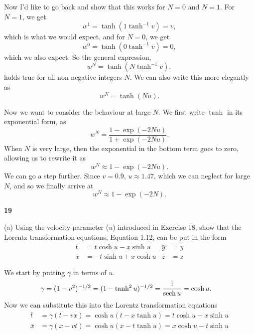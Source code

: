 \documentclass[gr-notes.tex]{subfiles}
\begin{document}
Now I'd like to go back and show that this works for $N=0$ and $N=1$. For $N=1$, we get
%
\begin{displaymath}
  w^1 = \tanh( 1 \tanh^{-1} v ) = v,
\end{displaymath}
%
which is what we would expect, and for $N=0$, we get
%
\begin{displaymath}
  w^0 = \tanh( 0 \tanh^{-1} v ) = 0,
\end{displaymath}
%
which we also expect. So the general expression,
%
\begin{displaymath}
  w^N = \tanh( N \tanh^{-1} v ),
\end{displaymath}
%
holds true for all non-negative integers $N$. We can also write this more elegantly as
%
\begin{displaymath}
  w^N = \tanh( N u ).
\end{displaymath}

Now we want to consider the behaviour at large $N$. We first write $\tanh$ in its exponential form, as
%
\begin{displaymath}
  w^N = \frac{1 - \exp(-2 N u)}{1 + \exp(-2 N u)}.
\end{displaymath}
%
When $N$ is very large, then the exponential in the bottom term goes to zero, allowing us to rewrite it as
%
\begin{displaymath}
  w^N \approx 1 - \exp(-2 N u).
\end{displaymath}
%
We can go a step further. Since $v = 0.9$, $u \approx 1.47$, which we can neglect for large $N$, and so we finally arrive at
%
\begin{displaymath}
  w^N \approx 1 - \exp(-2 N).
\end{displaymath}


\textbf{19}

(a) Using the velocity parameter ($u$) introduced in Exercise 18, show that the Lorentz transformation equations, Equation 1.12, can be put in the form
%
\begin{align*}
  \bar{t} &=  t \cosh u - x \sinh u & \bar{y} &= y
  \\
  \bar{x} &= -t \sinh u + x \cosh u & \bar{z} &= z
\end{align*}

We start by putting $\gamma$ in terms of $u$.
%
\begin{align*}
  \gamma &=
  (1 - v^2)^{-1/2} =
  (1 - \tanh^2 u)^{-1/2} =
  \frac{1}{\sech u} =
  \cosh u.
\end{align*}
%
Now we can substitute this into the Lorentz transformation equations
%
\begin{align*}
  \bar{t} &=
  \gamma (t - v x) =
  \cosh u (t - x \tanh u) =
  t \cosh u - x \sinh u
  \\
  \bar{x} &=
  \gamma (x - v t) =
  \cosh u (x - t \tanh u) =
  x \cosh u - t \sinh u
\end{align*}
\end{document}
